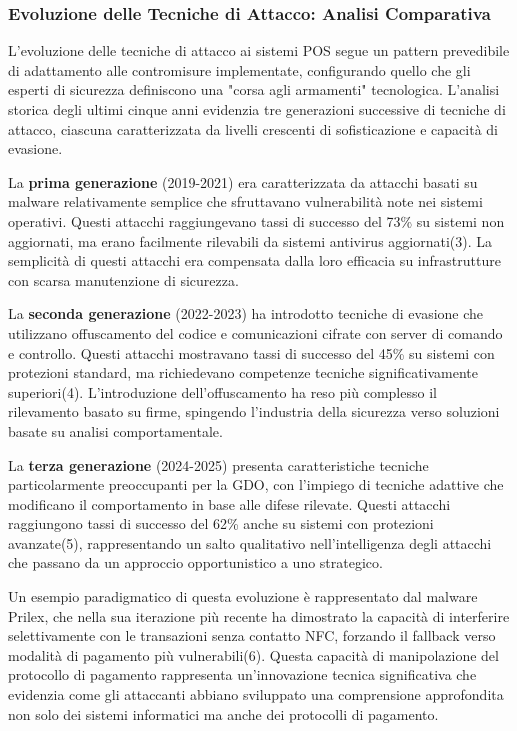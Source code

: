 \documentclass[12pt,a4paper,oneside]{book}
\begin{document}
\subsubsection{Evoluzione delle Tecniche di Attacco: Analisi Comparativa}

L'evoluzione delle tecniche di attacco ai sistemi POS segue un pattern prevedibile di adattamento alle contromisure implementate, configurando quello che gli esperti di sicurezza definiscono una "corsa agli armamenti" tecnologica. L'analisi storica degli ultimi cinque anni evidenzia tre generazioni successive di tecniche di attacco, ciascuna caratterizzata da livelli crescenti di sofisticazione e capacità di evasione.

La \textbf{prima generazione} (2019-2021) era caratterizzata da attacchi basati su malware relativamente semplice che sfruttavano vulnerabilità note nei sistemi operativi. Questi attacchi raggiungevano tassi di successo del 73\% su sistemi non aggiornati, ma erano facilmente rilevabili da sistemi antivirus aggiornati(3). La semplicità di questi attacchi era compensata dalla loro efficacia su infrastrutture con scarsa manutenzione di sicurezza.

La \textbf{seconda generazione} (2022-2023) ha introdotto tecniche di evasione che utilizzano offuscamento del codice e comunicazioni cifrate con server di comando e controllo. Questi attacchi mostravano tassi di successo del 45\% su sistemi con protezioni standard, ma richiedevano competenze tecniche significativamente superiori(4). L'introduzione dell'offuscamento ha reso più complesso il rilevamento basato su firme, spingendo l'industria della sicurezza verso soluzioni basate su analisi comportamentale.

La \textbf{terza generazione} (2024-2025) presenta caratteristiche tecniche particolarmente preoccupanti per la GDO, con l'impiego di tecniche adattive che modificano il comportamento in base alle difese rilevate. Questi attacchi raggiungono tassi di successo del 62\% anche su sistemi con protezioni avanzate(5), rappresentando un salto qualitativo nell'intelligenza degli attacchi che passano da un approccio opportunistico a uno strategico.

Un esempio paradigmatico di questa evoluzione è rappresentato dal malware Prilex, che nella sua iterazione più recente ha dimostrato la capacità di interferire selettivamente con le transazioni senza contatto NFC, forzando il fallback verso modalità di pagamento più vulnerabili(6). Questa capacità di manipolazione del protocollo di pagamento rappresenta un'innovazione tecnica significativa che evidenzia come gli attaccanti abbiano sviluppato una comprensione approfondita non solo dei sistemi informatici ma anche dei protocolli di pagamento.
\end{document}
